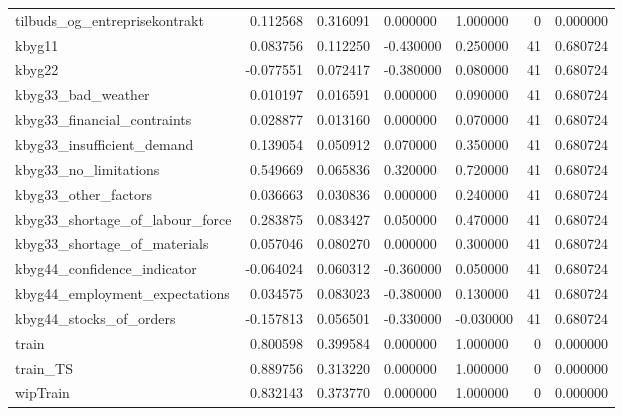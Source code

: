 \begin{landscape}
\begin{longtable}[h!]{lrrllrr}
tilbuds_og_entreprisekontrakt & 0.112568 & 0.316091 & 0.000000 & 1.000000 & 0 & 0.000000 \\
kbyg11 & 0.083756 & 0.112250 & -0.430000 & 0.250000 & 41 & 0.680724 \\
kbyg22 & -0.077551 & 0.072417 & -0.380000 & 0.080000 & 41 & 0.680724 \\
kbyg33_bad_weather & 0.010197 & 0.016591 & 0.000000 & 0.090000 & 41 & 0.680724 \\
kbyg33_financial_contraints & 0.028877 & 0.013160 & 0.000000 & 0.070000 & 41 & 0.680724 \\
kbyg33_insufficient_demand & 0.139054 & 0.050912 & 0.070000 & 0.350000 & 41 & 0.680724 \\
kbyg33_no_limitations & 0.549669 & 0.065836 & 0.320000 & 0.720000 & 41 & 0.680724 \\
kbyg33_other_factors & 0.036663 & 0.030836 & 0.000000 & 0.240000 & 41 & 0.680724 \\
kbyg33_shortage_of_labour_force & 0.283875 & 0.083427 & 0.050000 & 0.470000 & 41 & 0.680724 \\
kbyg33_shortage_of_materials & 0.057046 & 0.080270 & 0.000000 & 0.300000 & 41 & 0.680724 \\
kbyg44_confidence_indicator & -0.064024 & 0.060312 & -0.360000 & 0.050000 & 41 & 0.680724 \\
kbyg44_employment_expectations & 0.034575 & 0.083023 & -0.380000 & 0.130000 & 41 & 0.680724 \\
kbyg44_stocks_of_orders & -0.157813 & 0.056501 & -0.330000 & -0.030000 & 41 & 0.680724 \\
train & 0.800598 & 0.399584 & 0.000000 & 1.000000 & 0 & 0.000000 \\
train_TS & 0.889756 & 0.313220 & 0.000000 & 1.000000 & 0 & 0.000000 \\
wipTrain & 0.832143 & 0.373770 & 0.000000 & 1.000000 & 0 & 0.000000 \\
\end{longtable}\end{landscape}
